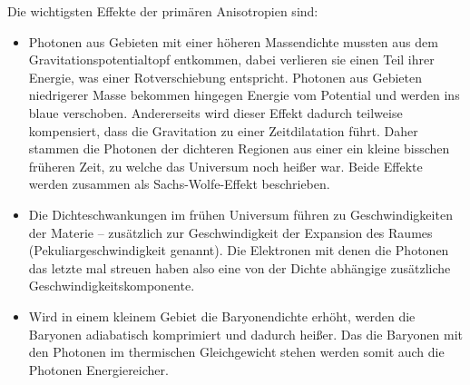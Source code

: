 \documentclass[10pt,a4paper]{article}
\begin{document}
Die wichtigsten Effekte der primären Anisotropien sind:
\begin{itemize}
\item Photonen aus Gebieten mit einer höheren Massendichte mussten aus dem Gravitationspotentialtopf entkommen, dabei verlieren sie einen Teil ihrer Energie, was einer Rotverschiebung entspricht. Photonen aus Gebieten niedrigerer Masse bekommen hingegen Energie vom Potential und werden ins blaue verschoben. Andererseits wird dieser Effekt dadurch teilweise kompensiert, dass die Gravitation zu einer Zeitdilatation führt. Daher stammen die Photonen der dichteren Regionen aus einer ein kleine bisschen früheren Zeit, zu welche das Universum noch heißer war. Beide Effekte werden zusammen als Sachs-Wolfe-Effekt beschrieben.
\item Die Dichteschwankungen im frühen Universum führen zu Geschwindigkeiten der Materie -- zusätzlich zur Geschwindigkeit der Expansion des Raumes (Pekuliargeschwindigkeit genannt). Die Elektronen mit denen die Photonen das letzte mal streuen haben also eine von der Dichte abhängige zusätzliche Geschwindigkeitskomponente. %
\item Wird in einem kleinem Gebiet die Baryonendichte erhöht, werden die Baryonen adiabatisch komprimiert und dadurch heißer. Das die Baryonen mit den Photonen im thermischen Gleichgewicht stehen werden somit auch die Photonen Energiereicher.
\end{itemize}
\end{document}
